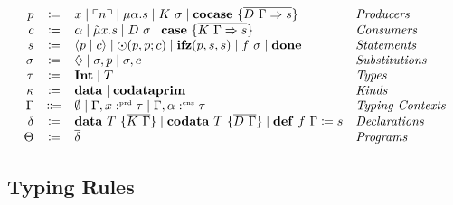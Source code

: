 \begin{definition}
    \[
      \begin{array}{rcll}
        p & \coloneqq & x \mid \lit{n} \mid \mu\alpha.s \mid K\ \sigma \mid \cocase{\overline{D\ \Gamma \Rightarrow s}} & \emph{Producers}\\
        c & \coloneqq & \alpha \mid \tilde{\mu}x.s \mid D\ \sigma \mid \case{\overline{K\ \Gamma \Rightarrow s}}& \emph{Consumers}\\
        s & \coloneqq & \cut{p}{c} \mid \odot(p, p; c) \mid \ifz{p}{s}{s} \mid f\ \sigma\mid \done & \emph{Statements}\\
        \sigma & \coloneqq & \nil \mid \sigma, p \mid \sigma, c & \emph{Substitutions}\\
        \tau & \coloneqq & \tyint \mid T & \emph{Types}\\
        \kappa & \coloneqq & \mathbf{data}\mid\mathbf{codata}\mathbf{prim} & \emph{Kinds}\\
        \Gamma & \Coloneqq & \emptyset \mid \Gamma, x \prd \tau \mid \Gamma, \alpha \cnt \tau & \emph{Typing Contexts} \\
        \delta & \coloneqq & \mathbf{data}\ T\ \{ \overline{K\ \Gamma} \} \mid \mathbf{codata}\ T\ \{ \overline{D\ \Gamma }\} \mid \defi{f\ \Gamma}{s} & \emph{Declarations}\\
       \Theta & \coloneqq & \overline{\delta} & \emph{Programs}\\
     \end{array}
    \]
  \end{definition}

\subsection{Typing Rules}
\label{subsec:core:typing-rules}

